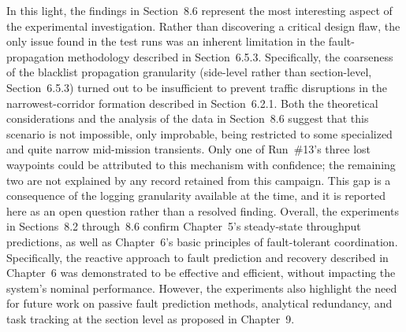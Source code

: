 In this light, the findings in Section~8.6 represent the most interesting aspect of the experimental investigation. Rather than discovering a critical design flaw, the only issue found in the test runs was an inherent limitation in the fault-propagation methodology described in Section~6.5.3. Specifically, the coarseness of the blacklist propagation granularity (side-level rather than section-level, Section~6.5.3) turned out to be insufficient to prevent traffic disruptions in the narrowest-corridor formation described in Section~6.2.1. Both the theoretical considerations and the analysis of the data in Section~8.6 suggest that this scenario is not impossible, only improbable, being restricted to some specialized and quite narrow mid-mission transients. Only one of Run~\#13's three lost waypoints could be attributed to this mechanism with confidence; the remaining two are not explained by any record retained from this campaign. This gap is a consequence of the logging granularity available at the time, and it is reported here as an open question rather than a resolved finding. Overall, the experiments in Sections~8.2 through~8.6 confirm Chapter~5's steady-state throughput predictions, as well as Chapter~6's basic principles of fault-tolerant coordination. Specifically, the reactive approach to fault prediction and recovery described in Chapter~6 was demonstrated to be effective and efficient, without impacting the system's nominal performance. However, the experiments also highlight the need for future work on passive fault prediction methods, analytical redundancy, and task tracking at the section level as proposed in Chapter~9.